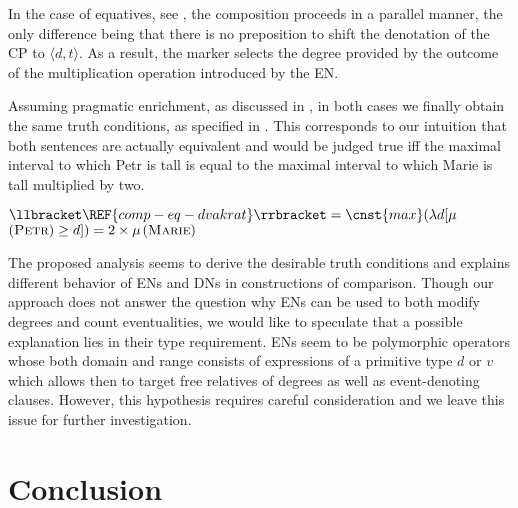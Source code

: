 \documentclass[output=paper,modfonts,hidelinks,newtxmath
\ChapterDOI{10.5281/zenodo.2545513}
]{langscibook}
\begin{document}
In the case of equatives, see , the composition proceeds in a parallel manner, the only difference being that there is no  preposition to shift the denotation of the CP to $\langle d,t\rangle$. As a result, the  marker selects the degree provided by the outcome of the multiplication operation introduced by the EN.

Assuming pragmatic enrichment, as discussed in , in both cases we finally obtain the same truth conditions, as specified in . This corresponds to our intuition that both sentences are actually equivalent and would be judged true iff the maximal interval to which Petr is tall is equal to the maximal interval to which Marie is tall multiplied by two.


\ea $\llbracket \REF{comp-eq-dvakrat}\rrbracket = \cnst{max}(\lambda d[\mu$$(\textsc{Petr})\geq d]) = 2 \times \mu$$(\textsc{Marie})$\label{eq-dvakrat-int}
\z

\noindent The proposed analysis seems to derive the desirable truth conditions and explains different behavior of ENs and DNs in constructions of comparison. Though our approach does not answer the question why ENs can be used to both modify degrees and count eventualities, we would like to speculate that a possible explanation lies in their type requirement. ENs seem to be polymorphic operators whose both domain and range consists of expressions of a primitive type $d$ or $v$ which allows then to target free relatives of degrees as well as event-denoting clauses. However, this hypothesis requires careful consideration and we leave this issue for further investigation. 

\section{Conclusion}\label{conclusion}
\end{document}
